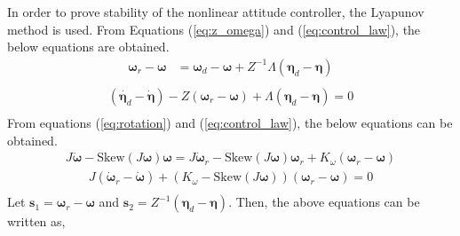 In order to prove stability of the nonlinear attitude controller, the Lyapunov method is used. From Equations (\ref{eq:z_omega}) and (\ref{eq:control_law}), the below equations are obtained.\\
\begin{equation}
\begin{aligned}
{\boldsymbol \omega}_r - {\boldsymbol \omega} & = {\boldsymbol \omega}_d -  {\boldsymbol \omega} + Z^{-1} \Lambda  ({\boldsymbol \eta}_d - {\boldsymbol \eta}) \\
\end{aligned}
\end{equation}
\begin{equation}
\begin{aligned}
(\dot{{\boldsymbol \eta}_d} - \dot{\boldsymbol \eta}) - Z({\boldsymbol \omega}_r - {\boldsymbol \omega}) + \Lambda  ({\boldsymbol \eta}_d - {\boldsymbol \eta}) = 0 \\
\end{aligned}
\end{equation}
From equations (\ref{eq:rotation}) and (\ref{eq:control_law}), the below equations can be obtained.\\
\begin{equation}
\begin{aligned}
 J {\dot {\boldsymbol \omega}} -\text{Skew} (J {\boldsymbol \omega}) {\boldsymbol \omega} = J {\dot {\boldsymbol \omega}_r} - {\text {Skew}}(J {\boldsymbol \omega}) {\boldsymbol \omega}_r + K_{\omega}  ({\boldsymbol \omega}_r - {\boldsymbol \omega})
\end{aligned}
\end{equation}
\begin{equation}
\begin{aligned}
J ({\dot {\boldsymbol \omega}_r} - {\dot {\boldsymbol \omega}}) + (K_{\omega} - {\text {Skew}}(J {\boldsymbol \omega})) ({\boldsymbol \omega}_r - {\boldsymbol \omega})
 = 0 \\
\end{aligned}
\end{equation}
Let \( {{\boldsymbol s}_1} = {\boldsymbol \omega}_r  - {\boldsymbol \omega} \) and \( {{\boldsymbol s}_2} = Z^{-1} ({\boldsymbol \eta}_d - {\boldsymbol \eta}) \). Then, the above equations can be written as, \\
